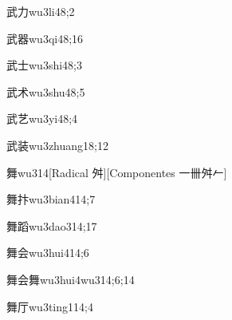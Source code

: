 \begin{verbete}{武力}{wu3li4}{8;2}
\end{verbete}

\begin{verbete}{武器}{wu3qi4}{8;16}
\end{verbete}

\begin{verbete}{武士}{wu3shi4}{8;3}
\end{verbete}

\begin{verbete}{武术}{wu3shu4}{8;5}
\end{verbete}

\begin{verbete}{武艺}{wu3yi4}{8;4}
\end{verbete}

\begin{verbete}{武装}{wu3zhuang1}{8;12}
\end{verbete}

\begin{verbete}{舞}{wu3}{14}[Radical 舛][Componentes 一卌舛𠂉]
\end{verbete}

\begin{verbete}{舞抃}{wu3bian4}{14;7}
\end{verbete}

\begin{verbete}{舞蹈}{wu3dao3}{14;17}
\end{verbete}

\begin{verbete}{舞会}{wu3hui4}{14;6}
\end{verbete}

\begin{verbete}{舞会舞}{wu3hui4wu3}{14;6;14}
\end{verbete}

\begin{verbete}{舞厅}{wu3ting1}{14;4}
\end{verbete}


